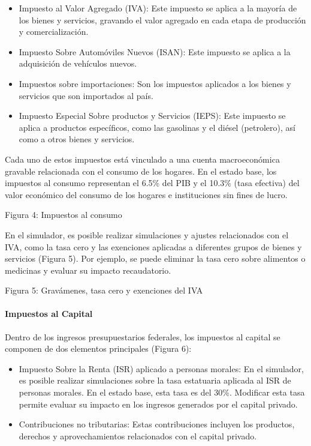 \begin{itemize}
\item
  Impuesto al Valor Agregado (IVA): Este impuesto se aplica a la mayoría
  de los bienes y servicios, gravando el valor agregado en cada etapa de
  producción y comercialización.
\item
  Impuesto Sobre Automóviles Nuevos (ISAN): Este impuesto se aplica a la
  adquisición de vehículos nuevos.
\item
  Impuestos sobre importaciones: Son los impuestos aplicados a los
  bienes y servicios que son importados al país.
\item
  Impuesto Especial Sobre productos y Servicios (IEPS): Este impuesto se
  aplica a productos específicos, como las gasolinas y el diésel
  (petrolero), así como a otros bienes y servicios.
\end{itemize}

Cada uno de estos impuestos está vinculado a una cuenta macroeconómica
gravable relacionada con el consumo de los hogares. En el estado base,
los impuestos al consumo representan el 6.5\% del PIB y el 10.3\% (tasa
efectiva) del valor económico del consumo de los hogares e instituciones
sin fines de lucro.

Figura 4: Impuestos al consumo


En el simulador, es posible realizar simulaciones y ajustes relacionados
con el IVA, como la tasa cero y las exenciones aplicadas a diferentes
grupos de bienes y servicios (Figura 5). Por ejemplo, se puede eliminar
la tasa cero sobre alimentos o medicinas y evaluar su impacto
recaudatorio.

Figura 5: Gravámenes, tasa cero y exenciones del IVA


\hypertarget{impuestos-al-capital}{%
\paragraph{Impuestos al Capital}\label{impuestos-al-capital}}

Dentro de los ingresos presupuestarios federales, los impuestos al
capital se componen de dos elementos principales (Figura 6):

\begin{itemize}
\item
  Impuesto Sobre la Renta (ISR) aplicado a personas morales: En el
  simulador, es posible realizar simulaciones sobre la tasa estatuaria
  aplicada al ISR de personas morales. En el estado base, esta tasa es
  del 30\%. Modificar esta tasa permite evaluar su impacto en los
  ingresos generados por el capital privado.
\item
  Contribuciones no tributarias: Estas contribuciones incluyen los
  productos, derechos y aprovechamientos relacionados con el capital
  privado.
\end{itemize}

